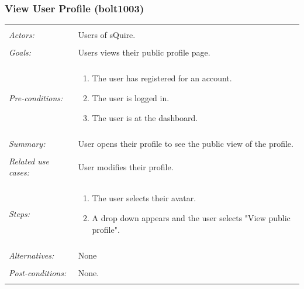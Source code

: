 \documentclass[11pt]{report}
\begin{document}
\subsubsection{View User Profile (bolt1003)}
\begin{tabular}{ p{2cm} p{12cm} }
 \hline
 \\
 \textit{Actors:} & Users of sQuire. \\ 
 \\
 \textit{Goals:} & Users views their public profile page. \\
 \\
 \textit{Pre-conditions:} & \begin{enumerate}
  \item The user has registered for an account.
  \item The user is logged in.
  \item The user is at the dashboard.
 \end{enumerate} \\
 \\
 \textit{Summary:} & User opens their profile to see the public view of the profile.\\ 
 \\
 \textit{Related use cases:} & User modifies their profile. \\ 
 \\
 \textit{Steps:} & \begin{enumerate}
  \item The user selects their avatar.
  \item A drop down appears and the user selects "View public profile".
 \end{enumerate} \\
 \\
 \textit{Alternatives:} & None \\
 \\
 \textit{Post-conditions:} & None. \\
 \\
\hline
\end{tabular}
\end{document}
